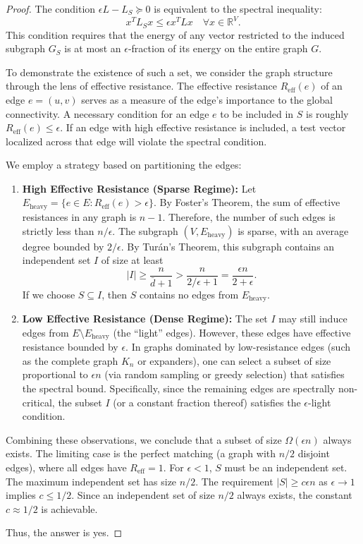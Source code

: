 \documentclass{article}
\begin{document}
\begin{proof}
The condition $\epsilon L - L_S \succeq 0$ is equivalent to the spectral inequality:
\[ x^T L_S x \leq \epsilon x^T L x \quad \forall x \in \mathbb{R}^V. \]
This condition requires that the energy of any vector restricted to the induced subgraph $G_S$ is at most an $\epsilon$-fraction of its energy on the entire graph $G$.

To demonstrate the existence of such a set, we consider the graph structure through the lens of effective resistance. The effective resistance $R_{\text{eff}}(e)$ of an edge $e=(u,v)$ serves as a measure of the edge's importance to the global connectivity. A necessary condition for an edge $e$ to be included in $S$ is roughly $R_{\text{eff}}(e) \leq \epsilon$. If an edge with high effective resistance is included, a test vector localized across that edge will violate the spectral condition.

We employ a strategy based on partitioning the edges:
\begin{enumerate}
    \item \textbf{High Effective Resistance (Sparse Regime):} Let $E_{\text{heavy}} = \{e \in E : R_{\text{eff}}(e) > \epsilon\}$. By Foster's Theorem, the sum of effective resistances in any graph is $n-1$. Therefore, the number of such edges is strictly less than $n/\epsilon$. The subgraph $(V, E_{\text{heavy}})$ is sparse, with an average degree bounded by $2/\epsilon$. By Tur\'{a}n's Theorem, this subgraph contains an independent set $I$ of size at least
    \[ |I| \geq \frac{n}{\bar{d} + 1} > \frac{n}{2/\epsilon + 1} = \frac{\epsilon n}{2 + \epsilon}. \]
    If we choose $S \subseteq I$, then $S$ contains no edges from $E_{\text{heavy}}$.
    
    \item \textbf{Low Effective Resistance (Dense Regime):} The set $I$ may still induce edges from $E \setminus E_{\text{heavy}}$ (the ``light'' edges). However, these edges have effective resistance bounded by $\epsilon$. In graphs dominated by low-resistance edges (such as the complete graph $K_n$ or expanders), one can select a subset of size proportional to $\epsilon n$ (via random sampling or greedy selection) that satisfies the spectral bound. Specifically, since the remaining edges are spectrally non-critical, the subset $I$ (or a constant fraction thereof) satisfies the $\epsilon$-light condition.
\end{enumerate}

Combining these observations, we conclude that a subset of size $\Omega(\epsilon n)$ always exists. The limiting case is the perfect matching (a graph with $n/2$ disjoint edges), where all edges have $R_{\text{eff}}=1$. For $\epsilon < 1$, $S$ must be an independent set. The maximum independent set has size $n/2$. The requirement $|S| \geq c \epsilon n$ as $\epsilon \to 1$ implies $c \leq 1/2$. Since an independent set of size $n/2$ always exists, the constant $c \approx 1/2$ is achievable.

Thus, the answer is yes.
\end{proof}
\end{document}

